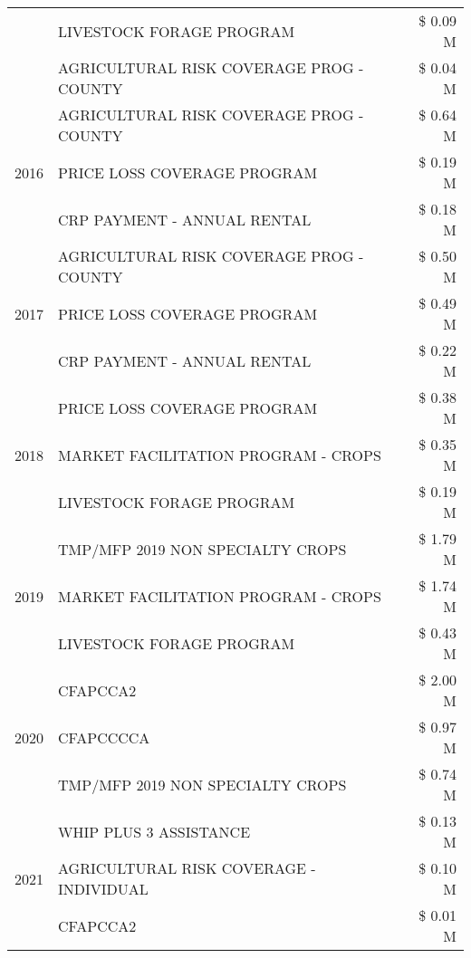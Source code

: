 \begin{tabular}{llr}
 & LIVESTOCK FORAGE PROGRAM & \$ 0.09 M \\
 & AGRICULTURAL RISK COVERAGE PROG - COUNTY & \$ 0.04 M \\
\cline{1-3}
\multirow[t]{3}{*}{2016} & AGRICULTURAL RISK COVERAGE PROG - COUNTY & \$ 0.64 M \\
 & PRICE LOSS COVERAGE PROGRAM & \$ 0.19 M \\
 & CRP PAYMENT - ANNUAL RENTAL & \$ 0.18 M \\
\cline{1-3}
\multirow[t]{3}{*}{2017} & AGRICULTURAL RISK COVERAGE PROG - COUNTY & \$ 0.50 M \\
 & PRICE LOSS COVERAGE PROGRAM & \$ 0.49 M \\
 & CRP PAYMENT - ANNUAL RENTAL & \$ 0.22 M \\
\cline{1-3}
\multirow[t]{3}{*}{2018} & PRICE LOSS COVERAGE PROGRAM & \$ 0.38 M \\
 & MARKET FACILITATION PROGRAM - CROPS & \$ 0.35 M \\
 & LIVESTOCK FORAGE PROGRAM & \$ 0.19 M \\
\cline{1-3}
\multirow[t]{3}{*}{2019} & TMP/MFP 2019 NON SPECIALTY CROPS & \$ 1.79 M \\
 & MARKET FACILITATION PROGRAM - CROPS & \$ 1.74 M \\
 & LIVESTOCK FORAGE PROGRAM & \$ 0.43 M \\
\cline{1-3}
\multirow[t]{3}{*}{2020} & CFAPCCA2 & \$ 2.00 M \\
 & CFAPCCCCA & \$ 0.97 M \\
 & TMP/MFP 2019 NON SPECIALTY CROPS & \$ 0.74 M \\
\cline{1-3}
\multirow[t]{3}{*}{2021} & WHIP PLUS 3 ASSISTANCE & \$ 0.13 M \\
 & AGRICULTURAL RISK COVERAGE - INDIVIDUAL & \$ 0.10 M \\
 & CFAPCCA2 & \$ 0.01 M \\
\cline{1-3}
\bottomrule
\end{tabular}
